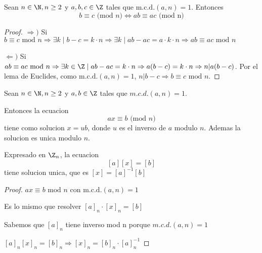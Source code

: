 \begin{lemma}
	Sean \(n \in \N, n \geq  2 \) y \(a,b,c \in  \Z\) tales que \(\mathrm{m.c.d.}(a,n) = 1 \). Entonces
	\[
		b \equiv c \text{ (mod } n ) \iff ab \equiv ac \text{ (mod n)}
	\]
\end{lemma}
\begin{proof}
	\(\Rightarrow ) \) Si \(b \equiv c \text{ mod } n  \Rightarrow \exists k \mid b - c= k \cdot n \Rightarrow \exists k \mid ab - ac = a \cdot k \cdot n \Rightarrow ab \equiv ac \text{ mod } n \)

	\(\Leftarrow ) \) Si \(ab \equiv ac \text{ mod } n \Rightarrow \exists  k \in \Z \mid ab - ac = k \cdot n \Rightarrow a(b-c) = k \cdot n \Rightarrow n|a(b-c)\). Por el lema de Euclides, como \(\mathrm{m.c.d.}(a,n) = 1  \), \(n|b-c \Rightarrow b \equiv c \text{ mod }  n \).
\end{proof}

\begin{proposition}
	Sean \(n \in \N, n \geq 2 \) y \(a,b \in \Z \) tales que \(m.c.d.(a,n) = 1 \).

	Entonces la ecuacion
	\[
		ax \equiv b \text{ (mod } n )
	\]
	tiene como solucion \(x = ub \), donde \(u \) es el inverso de \(a \) modulo \(n \). Ademas la solucion es unica modulo \(n \).

	Expresado en \(\Z_n \), la ecuacion
	\[
		[a][x] = [b ]
	\]
	tiene solucion unica, que es \([x] = [a]^{-1} [b]\)
\end{proposition}

\begin{proof}
	\(ax \equiv b \text{ mod } n \) con \(\mathrm{m.c.d.}(a,n) = 1  \)

	Es lo mismo que resolver \([a]_n \cdot [x]_n = [b]\)

	Sabemos que \([a]_n \) tiene inverso mod n porque \(m.c.d.(a,n) = 1 \)

	\([a]_n [x]_n = [b]_n \Rightarrow [x]_n = [b]_n \cdot [a]^{-1}_n\)
\end{proof}

